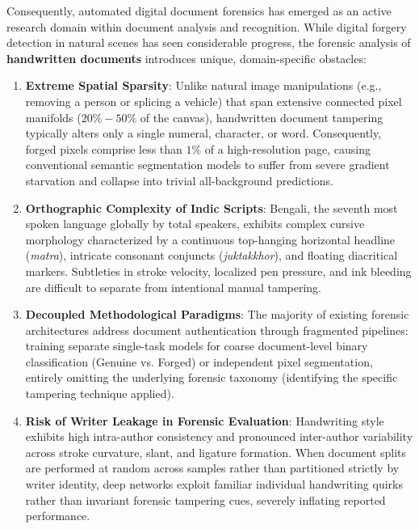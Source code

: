 \documentclass[pdflatex,sn-mathphys-num,iicol]{sn-jnl}
\begin{document}
Consequently, automated digital document forensics has emerged as an active research domain within document analysis and recognition. While digital forgery detection in natural scenes has seen considerable progress, the forensic analysis of \textbf{handwritten documents} introduces unique, domain-specific obstacles:
\begin{enumerate}[1.]
    \item \textbf{Extreme Spatial Sparsity}: Unlike natural image manipulations (e.g., removing a person or splicing a vehicle) that span extensive connected pixel manifolds ($20\%-50\%$ of the canvas), handwritten document tampering typically alters only a single numeral, character, or word. Consequently, forged pixels comprise less than $1\%$ of a high-resolution page, causing conventional semantic segmentation models to suffer from severe gradient starvation and collapse into trivial all-background predictions.
    \item \textbf{Orthographic Complexity of Indic Scripts}: Bengali, the seventh most spoken language globally by total speakers, exhibits complex cursive morphology characterized by a continuous top-hanging horizontal headline (\textit{matra}), intricate consonant conjuncts (\textit{juktakkhor}), and floating diacritical markers. Subtleties in stroke velocity, localized pen pressure, and ink bleeding are difficult to separate from intentional manual tampering.
    \item \textbf{Decoupled Methodological Paradigms}: The majority of existing forensic architectures address document authentication through fragmented pipelines: training separate single-task models for coarse document-level binary classification (Genuine vs. Forged) or independent pixel segmentation, entirely omitting the underlying forensic taxonomy (identifying the specific tampering technique applied).
    \item \textbf{Risk of Writer Leakage in Forensic Evaluation}: Handwriting style exhibits high intra-author consistency and pronounced inter-author variability across stroke curvature, slant, and ligature formation. When document splits are performed at random across samples rather than partitioned strictly by writer identity, deep networks exploit familiar individual handwriting quirks rather than invariant forensic tampering cues, severely inflating reported performance.
\end{enumerate}
\end{document}
